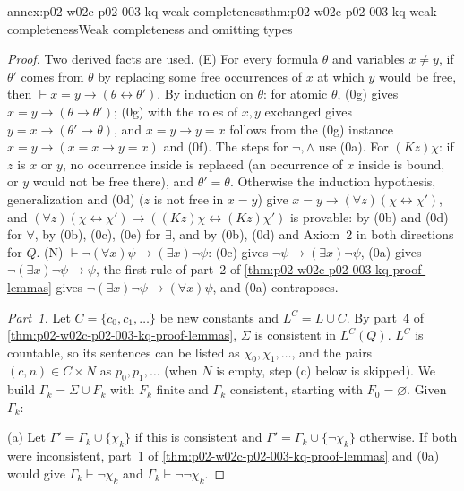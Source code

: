 \begin{annexitem}{annex:p02-w02c-p02-003-kq-weak-completeness}{thm:p02-w02c-p02-003-kq-weak-completeness}{Weak completeness and omitting types}
\begin{proof}
Two derived facts are used.  (E) For every formula \(\theta\) and
variables \(x\neq y\), if \(\theta'\) comes from \(\theta\) by replacing
some free occurrences of \(x\) at which \(y\) would be free, then
\(\vdash x=y\to(\theta\leftrightarrow\theta')\).  By induction on
\(\theta\): for atomic \(\theta\), (0g) gives \(x=y\to(\theta\to\theta')\);
(0g) with the roles of \(x,y\) exchanged gives
\(y=x\to(\theta'\to\theta)\), and \(x=y\to y=x\) follows from the (0g)
instance \(x=y\to(x=x\to y=x)\) and (0f).  The steps for \(\neg,\land\) use
(0a).  For \((Kz)\chi\): if \(z\) is \(x\) or \(y\), no occurrence inside is
replaced (an occurrence of \(x\) inside is bound, or \(y\) would not be
free there), and \(\theta'=\theta\).  Otherwise the induction hypothesis,
generalization and (0d) (\(z\) is not free in \(x=y\)) give
\(x=y\to(\forall z)(\chi\leftrightarrow\chi')\), and
\((\forall z)(\chi\leftrightarrow\chi')\to((Kz)\chi\leftrightarrow(Kz)\chi')\)
is provable: by (0b) and (0d) for \(\forall\), by (0b), (0c), (0e) for
\(\exists\), and by (0b), (0d) and Axiom~2 in both directions for \(Q\).
(N) \(\vdash\neg(\forall x)\psi\to(\exists x)\neg\psi\): (0c) gives
\(\neg\psi\to(\exists x)\neg\psi\), (0a) gives
\(\neg(\exists x)\neg\psi\to\psi\), the first rule of part~2 of
\cref{thm:p02-w02c-p02-003-kq-proof-lemmas} gives
\(\neg(\exists x)\neg\psi\to(\forall x)\psi\), and (0a) contraposes.

\emph{Part~1.}  Let \(C=\{c_0,c_1,\ldots\}\) be new constants and
\(L^{C}=L\cup C\).  By part~4 of \cref{thm:p02-w02c-p02-003-kq-proof-lemmas},
\(\Sigma\) is consistent in \(L^{C}(Q)\).  \(L^{C}\) is countable, so its
sentences can be listed as \(\chi_0,\chi_1,\ldots\), and the pairs
\((c,n)\in C\times N\) as \(p_0,p_1,\ldots\) (when \(N\) is empty, step
(c) below is skipped).  We build \(\Gamma_k=\Sigma\cup F_k\) with \(F_k\)
finite and \(\Gamma_k\) consistent, starting with \(F_0=\varnothing\).
Given \(\Gamma_k\):

(a) Let \(\Gamma'=\Gamma_k\cup\{\chi_k\}\) if this is consistent and
\(\Gamma'=\Gamma_k\cup\{\neg\chi_k\}\) otherwise.  If both were
inconsistent, part~1 of \cref{thm:p02-w02c-p02-003-kq-proof-lemmas} and
(0a) would give \(\Gamma_k\vdash\neg\chi_k\) and
\(\Gamma_k\vdash\neg\neg\chi_k\).


\end{proof}
\end{annexitem}
